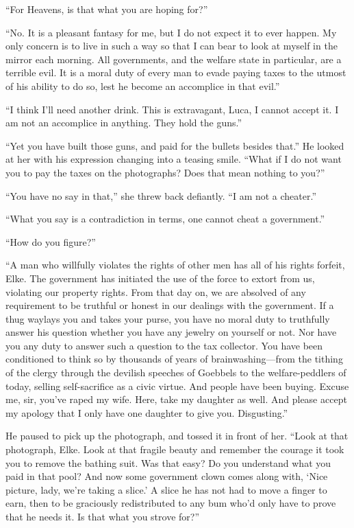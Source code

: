 ``For Heavens, is that what you are hoping for?''

``No. It is a pleasant fantasy for me, but I do not expect it to ever happen. My only concern is to live in such a way so that I can bear to look at myself in the mirror each morning. All governments, and the welfare state in particular, are a terrible evil. It is a moral duty of every man to evade paying taxes to the utmost of his ability to do so, lest he become an accomplice in that evil.''

``I think I'll need another drink. This is extravagant, Luca, I cannot accept it. I am not an accomplice in anything. They hold the guns.''

``Yet you have built those guns, and paid for the bullets besides that.'' He looked at her with his expression changing into a teasing smile. ``What if I do not want you to pay the taxes on the photographs? Does that mean nothing to you?''

``You have no say in that,'' she threw back defiantly. ``I am not a cheater.''

``What you say is a contradiction in terms, one cannot cheat a government.''

``How do you figure?''

``A man who willfully violates the rights of other men has all of his rights forfeit, Elke. The government has initiated the use of the force to extort from us, violating our property rights. From that day on, we are absolved of any requirement to be truthful or honest in our dealings with the government. If a thug waylays you and takes your purse, you have no moral duty to truthfully answer his question whether you have any jewelry on yourself or not. Nor have you any duty to answer such a question to the tax collector. You have been conditioned to think so by thousands of years of brainwashing---from the tithing of the clergy through the devilish speeches of Goebbels to the welfare-peddlers of today, selling self-sacrifice as a civic virtue. And people have been buying. Excuse me, sir, you've raped my wife. Here, take my daughter as well. And please accept my apology that I only have one daughter to give you. Disgusting.''

He paused to pick up the photograph, and tossed it in front of her. ``Look at that photograph, Elke. Look at that fragile beauty and remember the courage it took you to remove the bathing suit. Was that easy? Do you understand what you paid in that pool? And now some government clown comes along with, `Nice picture, lady, we're taking a slice.' A slice he has not had to move a finger to earn, then to be graciously redistributed to any bum who'd only have to prove that he needs it. Is that what you strove for?''

